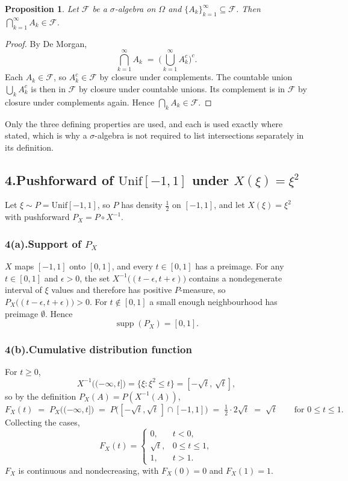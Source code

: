 \documentclass[11pt]{article}
\DeclareMathOperator{\supp}{supp}
\newtheorem{proposition}{Proposition}
\theoremstyle{definition}
\begin{document}
\begin{proposition}
Let $\mathcal{F}$ be a $\sigma$-algebra on $\Omega$ and
$\{A_k\}_{k=1}^{\infty} \subseteq \mathcal{F}$. Then
$\bigcap_{k=1}^{\infty} A_k \in \mathcal{F}$.
\end{proposition}

\begin{proof}
By De Morgan,
\[
  \bigcap_{k=1}^{\infty} A_k
  \;=\; \Big( \bigcup_{k=1}^{\infty} A_k^{c} \Big)^{c}.
\]
Each $A_k \in \mathcal{F}$, so $A_k^{c} \in \mathcal{F}$ by closure under
complements. The countable union $\bigcup_k A_k^{c}$ is then in
$\mathcal{F}$ by closure under countable unions. Its complement is in
$\mathcal{F}$ by closure under complements again. Hence
$\bigcap_k A_k \in \mathcal{F}$.
\end{proof}

Only the three defining properties are used, and each is used exactly
where stated, which is why a $\sigma$-algebra is not required to list
intersections separately in its definition.

\subsection*{4.\quad Pushforward of $\mathrm{Unif}[-1,1]$ under
  $X(\xi) = \xi^{2}$}

Let $\xi \sim P = \mathrm{Unif}[-1,1]$, so $P$ has density $\tfrac12$ on
$[-1,1]$, and let $X(\xi) = \xi^{2}$ with pushforward
$P_X = P \circ X^{-1}$.

\subsubsection*{4(a).\quad Support of $P_X$}

$X$ maps $[-1,1]$ onto $[0,1]$, and every
$t \in [0,1]$ has a preimage. For any $t \in [0,1]$ and $\epsilon>0$, the
set $X^{-1}\big((t-\epsilon,t+\epsilon)\big)$ contains a nondegenerate
interval of $\xi$ values and therefore has positive $P$-measure, so
$P_X\big((t-\epsilon,t+\epsilon)\big) > 0$. For $t \notin [0,1]$ a small
enough neighbourhood has preimage $\emptyset$. Hence
\[
  \supp(P_X) = [0,1].
\]

\subsubsection*{4(b).\quad Cumulative distribution function}

For $t \ge 0$,
\[
  X^{-1}\big((-\infty,t]\big)
  = \{\xi : \xi^{2} \le t\}
  = [-\sqrt{t},\,\sqrt{t}],
\]
so by the definition $P_X(A) = P(X^{-1}(A))$,
\[
  F_X(t) \;=\; P_X\big((-\infty,t]\big)
  \;=\; P\big([-\sqrt{t},\sqrt{t}\,] \cap [-1,1]\big)
  \;=\; \tfrac12 \cdot 2\sqrt{t} \;=\; \sqrt{t}
  \qquad \text{for } 0 \le t \le 1 .
\]
Collecting the cases,
\[
  F_X(t) =
  \begin{cases}
    0, & t < 0,\\[2pt]
    \sqrt{t}, & 0 \le t \le 1,\\[2pt]
    1, & t > 1 .
  \end{cases}
\]
$F_X$ is continuous and nondecreasing, with $F_X(0)=0$ and $F_X(1)=1$.
\end{document}
